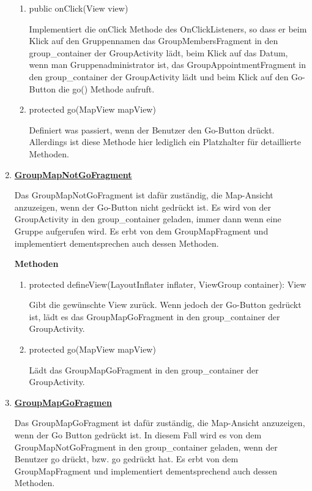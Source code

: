 \begin{enumerate}
\begin{enumerate}
		\item public onClick(View view)
		
		Implementiert die onClick Methode des OnClickListeners, so dass er beim Klick auf den Gruppennamen das GroupMembersFragment in den group\_container der GroupActivity lädt, beim Klick auf das Datum, wenn man Gruppenadministrator ist, das GroupAppointmentFragment in den group\_container der GroupActivity lädt und beim Klick auf den Go-Button die go() Methode aufruft.
		
		\item protected go(MapView mapView)
		
		Definiert was passiert, wenn der Benutzer den Go-Button drückt. Allerdings ist diese Methode hier lediglich ein Platzhalter für detaillierte Methoden.
	\end{enumerate}
	
	\item \textbf{\underline{GroupMapNotGoFragment}}
	
	Das GroupMapNotGoFragment ist dafür zuständig, die Map-Ansicht anzuzeigen, wenn der Go-Button nicht gedrückt ist. Es wird von der GroupActivity in den group\_container geladen, immer dann wenn eine Gruppe aufgerufen wird. Es erbt von dem GroupMapFragment und implementiert dementsprechen auch dessen Methoden.
	
	\textbf{Methoden}	
	\begin{enumerate}
		
		\item protected defineView(LayoutInflater inflater, ViewGroup container): View

		Gibt die gewünschte View zurück. Wenn jedoch der Go-Button gedrückt ist, lädt es das GroupMapGoFragment in den group\_container der GroupActivity.
		
		\item protected go(MapView mapView)
		
		Lädt das GroupMapGoFragment in den group\_container der GroupActivity.
	\end{enumerate}
			
	\item \textbf{\underline{GroupMapGoFragmen}}

	Das GroupMapGoFragment ist dafür zuständig, die Map-Ansicht anzuzeigen, wenn der Go Button gedrückt ist. In diesem Fall wird es von dem GroupMapNotGoFragment in den group\_container geladen, wenn der Benutzer go drückt, bzw. go gedrückt hat. Es erbt von dem GroupMapFragment und implementiert dementsprechend auch dessen Methoden.


\end{enumerate}
